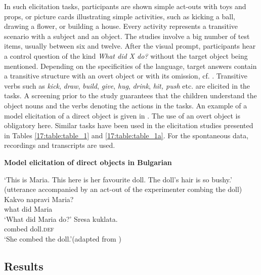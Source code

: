 \documentclass[output=paper,
modfonts,
newtxmath,
hidelinks,
]{langscibook}
\begin{document}
\noindent In such elicitation tasks, participants are shown simple act-outs with toys and props, or picture cards illustrating simple activities, such as kicking a ball, drawing a flower, or building a house. Every activity represents a transitive scenario with a subject and an object. The studies involve a big number of test items, usually between six and twelve. After the visual prompt, participants hear a control question of the kind \textit{What did X do?} without the target object being mentioned. Depending on the specificities of the language, target answers contain a transitive structure with an overt object or with its omission, cf. . Transitive verbs such as \textit{kick}, \textit{draw}, \textit{build}, \textit{give}, \textit{hug}, \textit{drink}, \textit{hit, push} etc. are elicited in the tasks. A screening prior to the study guarantees that the children understand the object nouns and the verbs denoting the actions in the tasks. An example of a model elicitation of a direct object is given in . The use of an overt object is obligatory here. Similar tasks have been used in the elicitation studies presented in Tables \ref{17:table:table_1} and \ref{17:table:table_1a}. For the spontaneous data, recordings and transcripts are used.\largerpage[-2]

\ea \textbf{Model elicitation of direct objects in Bulgarian}\label{17:ex5}
\begin{exe}
\exi{}   `This is Maria. This here is her favourite doll. The doll’s hair is so bushy.' (utterance accompanied by an act-out of the experimenter combing the doll)
\exi{}	\gll Kakvo napravi Maria?\\
     	what did Maria\\
		\glt ‘What did Maria do?’
\exi{}	\gll Sresa kuklata.\\
        combed doll.\textsc{def}\\
		\glt ‘She combed the doll.’\hfill (adapted from \citealt[79]{Radeva-Bork2012})
\end{exe}        
\z

\subsection{Results}\label{17:sec:key:3.2}
\end{document}
